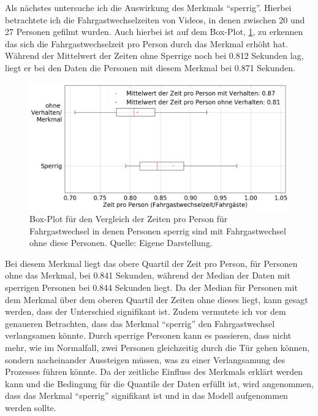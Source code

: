 Als nächstes untersuche ich die Auswirkung des Merkmals "`sperrig"'. Hierbei betrachtete ich die Fahrgastwechselzeiten von Videos, in denen zwischen 20 und 27 Personen gefilmt wurden. Auch hierbei ist auf dem Box-Plot, \figurename \ref{fig:BoxPlotSperrig}, zu erkennen das sich die Fahrgastwechselzeit pro Person durch das Merkmal erhöht hat. Während der Mittelwert der Zeiten ohne Sperrige noch bei 0.812 Sekunden lag, liegt er bei den Daten die Personen mit diesem Merkmal bei 0.871 Sekunden.
\begin{figure}[H]
	\centering
		\includegraphics[height=0.3\textwidth]{pictures/data_evaluation/behavior/comp_Sperrig.png}
	\caption{Box-Plot für den Vergleich der Zeiten pro Person für Fahrgastwechsel in denen Personen sperrig sind mit Fahrgastwechsel ohne diese Personen. Quelle: Eigene Darstellung.}
	\label{fig:BoxPlotSperrig}
\end{figure}
Bei diesem Merkmal liegt das obere Quartil der Zeit pro Person, für Personen ohne das Merkmal, bei 0.841 Sekunden, während der Median der Daten mit sperrigen Personen bei 0.844 Sekunden liegt. Da der Median für Personen mit dem Merkmal über dem oberen Quartil der Zeiten ohne dieses liegt, kann gesagt werden, dass der Unterschied signifikant ist. Zudem vermutete ich vor dem genaueren Betrachten, dass das Merkmal "`sperrig"' den Fahrgastwechsel verlangsamen könnte. Durch sperrige Personen kann es passieren, dass nicht mehr, wie im Normalfall, zwei Personen gleichzeitig durch die Tür gehen können, sondern nacheinander Aussteigen müssen, was zu einer Verlangsamung des Prozesses führen könnte. Da der zeitliche Einfluss des Merkmals erklärt werden kann und die Bedingung für die Quantile der Daten erfüllt ist, wird angenommen, dass das Merkmal "`sperrig"' signifikant ist und in das Modell aufgenommen werden sollte.


